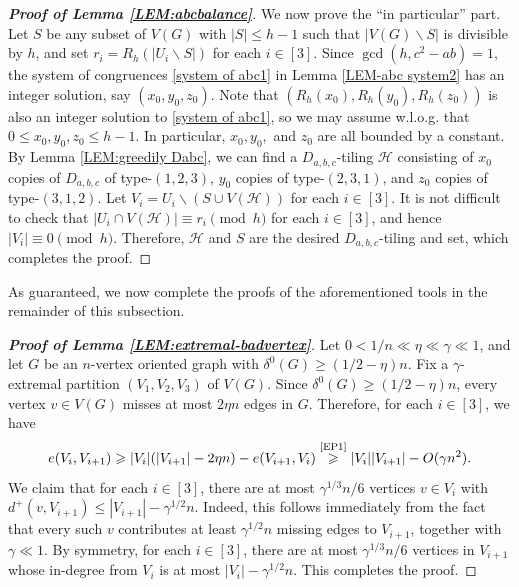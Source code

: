 \documentclass[11pt,a4paper,reqno]{amsart}
\theoremstyle{definition} %
\begin{document}
\begin{proof}[\textbf{Proof of Lemma \ref{LEM:abcbalance}}]
We now prove the ``in particular'' part. Let $S$ be any subset of $V(G)$ with $|S|\leqslant h-1$ such that $|V(G)\backslash S|$ is divisible by $h$, and set
$r_i=R_h(|U_i\backslash S|)$ 
for each $i\in[3]$. Since $\gcd(h,c^2-ab)=1$, the system of congruences \eqref{system of abc1} in Lemma \ref{LEM-abc system2} has an integer solution, say $(x_0,y_0,z_0)$. Note that $(R_h(x_0),R_h(y_0),R_h(z_0))$ is also an integer solution to \eqref{system of abc1}, so we may assume w.l.o.g. that
$0\leqslant x_0,y_0,z_0\leqslant h-1$. 
In particular, $x_0,y_0,$ and $z_0$ are all bounded by a constant. By Lemma \ref{LEM:greedily Dabc}, we can find a $D_{a,b,c}$-tiling $\mathcal{H}$ consisting of $x_0$ copies of $D_{a,b,c}$ of type-$(1,2,3)$, $y_0$ copies of type-$(2,3,1)$, and $z_0$ copies of type-$(3,1,2)$. Let
$V_i=U_i\backslash (S\cup V(\mathcal{H}))$ 
for each $i\in[3]$. It is not difficult to check that
$|U_i\cap V(\mathcal{H})|\equiv r_i\pmod{h}$ 
for each $i\in[3]$, and hence $|V_i|\equiv 0\pmod h$. Therefore, $\mathcal{H}$ and $S$ are the desired $D_{a,b,c}$-tiling and set, which completes the proof.
\end{proof}


As guaranteed, we now complete the proofs of the aforementioned tools in the remainder of this subsection.

\begin{proof}[\textbf{Proof of Lemma \ref{LEM:extremal-badvertex}}]
Let $0<1/n\ll\eta\ll\gamma\ll 1$, and let $G$ be an $n$-vertex oriented graph with $\delta^0(G)\geqslant (1/2-\eta)n$. Fix a $\gamma$-extremal partition $(V_1,V_2,V_3)$ of $V(G)$. Since $\delta^0(G)\geqslant (1/2-\eta)n$, every vertex $v\in V(G)$ misses at most $2\eta n$ edges in $G$. Therefore, for each $i\in[3]$, we have
$$
e(V_i,V_{i+1})\geqslant |V_i|(|V_{i+1}|-2\eta n)-e(V_{i+1},V_i)\overset{\scriptstyle\text{\ref{EP1}}}{\geqslant} |V_i||V_{i+1}|-O(\gamma n^2).
$$
We claim that for each $i\in[3]$, there are at most $\gamma^{1/3}n/6$ vertices $v\in V_i$ with $d^+(v,V_{i+1})\leqslant |V_{i+1}|-\gamma^{1/2}n$. Indeed, this follows immediately from the fact that every such $v$ contributes at least $\gamma^{1/2}n$ missing edges to $V_{i+1}$, together with $\gamma\ll 1$. By symmetry, for each $i\in[3]$, there are at most $\gamma^{1/3}n/6$ vertices in $V_{i+1}$ whose in-degree from $V_i$ is at most $|V_i|-\gamma^{1/2}n$. This completes the proof.
\end{proof}
\end{document}
